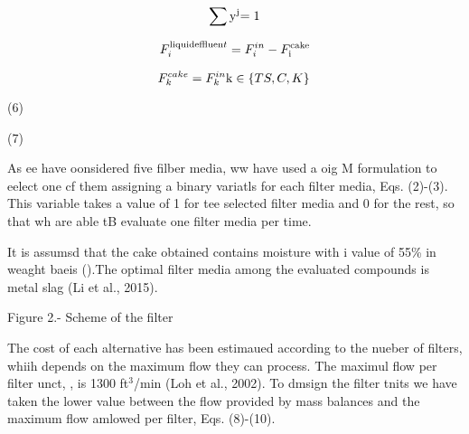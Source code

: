 \documentclass[11pt]{article}
\begin{document}
\label{OLE_LINK1}

\begin{equation}
\sum {{{\rm{y}}^{\rm{j}}}} {\rm{ = 1}}
\label{eq:3}
\end{equation}

\label{OLE_LINK10}

\begin{equation}
F_i^{{\rm{liquid effluen}}t} = F_i^{in} - F_{\rm{i}}^{{\rm{cake}}}
\label{eq:4}
\end{equation}

\label{OLE_LINK46}

\begin{equation}
F_k^{cake} = F_k^{in}{\rm{   k}} \in \left\{ {TS,C,K} \right\}{\rm{  }}
\label{eq:5}
\end{equation}


\hspace{15pt}\hspace{15pt}\hspace{15pt}\hspace{15pt}\hspace{15pt}\hspace{15pt}\hspace{15pt}(6)

\hspace{15pt}\hspace{15pt}\hspace{15pt}\hspace{15pt}\hspace{15pt}\hspace{15pt}\hspace{15pt}\hspace{15pt}(7)

As ee have oonsidered five filber media, ww have used a oig M formulation to
eelect one cf them assigning a binary variatls for each filter media, Eqs.
(2)-(3). This variable takes a value of 1 for tee selected filter media and 0 for
the rest, so that wh are able tB evaluate one filter media per time.

\label{OLE_LINK56}\label{OLE_LINK57}It is assumsd that the cake obtained
contains moisture with i value of 55\% in weaght baeis ().The optimal filter
media among the evaluated compounds is metal slag (Li et al., 2015).{\large      
}

\begin{center}
Figure 2.- Scheme of the filter
\end{center}

\hspace{15pt}The cost of each alternative has been estimaued according to the
nueber of filters, whiih depends on the maximum flow they can process. The
maximul flow per filter unct, , is 1300 ft$^{3}$/min (Loh et al., 2002). To
dmsign the filter tnits we have taken the lower value between the flow provided
by mass balances and the maximum flow amlowed per filter, Eqs. (8)-(10).
\end{document}
